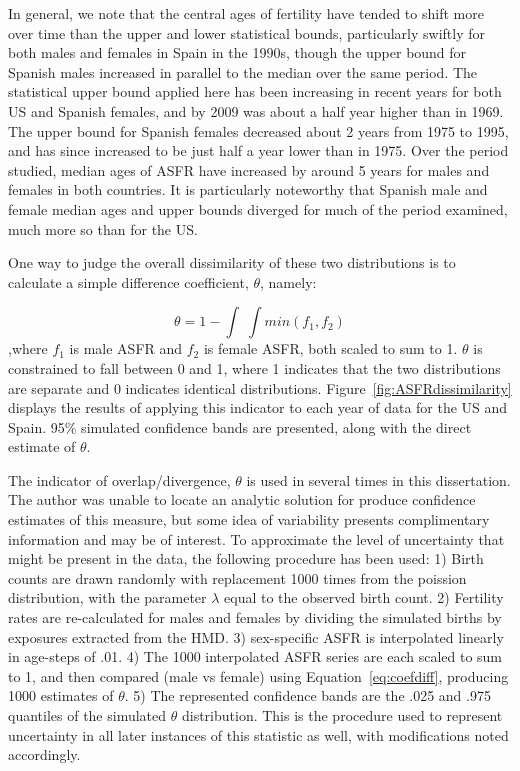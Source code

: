 In general, we note that the central ages of fertility have tended to shift more
over time than the upper and lower statistical bounds, particularly swiftly for
both males and females in Spain in the 1990s, though the upper bound for
Spanish males increased in parallel to the median over the same period. The
statistical upper bound applied here has been increasing in recent years for
both US and Spanish females, and by 2009 was about a half year higher than in
1969. The upper bound for Spanish females decreased about 2 years from 1975
to 1995, and has since increased to be just half a year lower than in 1975. Over
the period studied, median ages of ASFR have increased by around 5 years for
males and females in both countries. It is particularly noteworthy that Spanish
male and female median ages and upper bounds diverged for much of the period
examined, much more so than for the US.

One way to judge the overall dissimilarity of these two distributions is to
calculate a simple difference coefficient, $\theta$, namely:

\begin{equation}
\label{eq:coefdiff}
\theta = 1 - \int \;\int min(f_1, f_2)
\end{equation}
,where $f_1$ is male ASFR and $f_2$ is female ASFR, both scaled to sum
to 1. $\theta$ is constrained to fall between 0 and 1, where 1 indicates that the
two distributions are separate and 0 indicates identical distributions.
Figure~\ref{fig:ASFRdissimilarity} displays the results of applying this
indicator to each year of data for the US and Spain. 95\% simulated confidence
bands are presented, along with the direct estimate of
$\theta$. 

The indicator of overlap/divergence, $\theta$ is
used in several times in this dissertation. The author was unable to locate
an analytic solution for produce confidence estimates of this measure, but
some idea of variability presents complimentary information and may be of
interest. To approximate the level of uncertainty that might be present in the
data, the following procedure has been used: 1) Birth counts are drawn randomly
with replacement 1000 times from the poission distribution, with the parameter
$\lambda$ equal to the observed birth count. 2) Fertility rates are
re-calculated for males and females by dividing the simulated births by
exposures extracted from the HMD. 3) sex-specific ASFR is interpolated linearly
in age-steps of .01. 4) The 1000 interpolated ASFR series are each scaled to sum
to 1, and then compared (male vs female) using Equation~\ref{eq:coefdiff}, producing 1000 estimates of
$\theta$. 5) The represented confidence bands are the .025 and .975 quantiles
of the simulated $\theta$ distribution. This is the procedure used to represent
uncertainty in all later instances of this statistic as well, with
modifications noted accordingly. 

